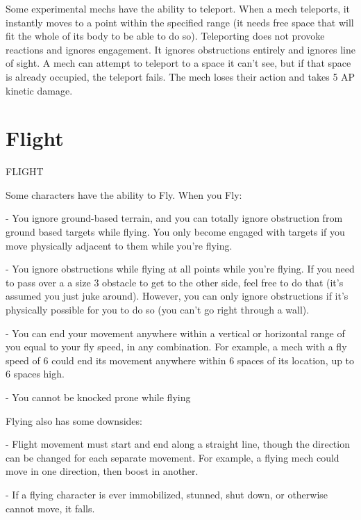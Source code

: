 Some experimental mechs have the ability to teleport. When a mech teleports, it instantly moves 
to a point within the specified range (it needs free space that will fit the whole of its body to be 
able to do so). Teleporting does not provoke reactions and ignores engagement. It ignores 
obstructions entirely and ignores line of sight. A mech can attempt to teleport to a space it can’t 
see, but if that space is already occupied, the teleport fails. The mech loses their action and takes 
5 AP kinetic damage. 

\section{Flight}
                                                   FLIGHT 

Some characters have the ability to Fly. When you Fly: 

                                                                                                                


    -    You ignore ground-based terrain, and you can totally ignore obstruction from ground  
         based targets while flying. You only become engaged with targets if you move physically  
         adjacent to them while you’re flying.
 
    -    You ignore obstructions while flying at all points while you’re flying. If you need to pass  
         over a a size 3 obstacle to get to the other side, feel free to do that (it’s assumed you just  
         juke around). However, you can only ignore obstructions if it’s physically possible for you  
         to do so (you can’t go right through a wall).
 
    -    You can end your movement anywhere within a vertical or horizontal range of you equal  
         to your fly speed, in any combination. For example, a mech with a fly speed of 6 could  
         end its movement anywhere within 6 spaces of its location, up to 6 spaces high.
 
    -    You cannot be knocked prone while flying
 

Flying also has some downsides:
 
             -    Flight movement must start and end along a straight line, though the direction  
                 can be changed for each separate movement. For example, a flying mech could  
                  move in one direction, then boost in another. 
 
             -    If a flying character is ever immobilized, stunned, shut down, or otherwise cannot  
                  move, it falls.
 
